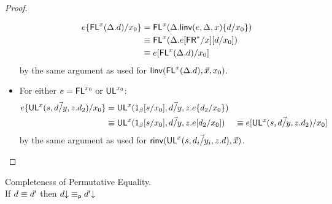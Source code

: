 \begin{proof}
\begin{itemize}
\begin{align*}
e\{\mathsf{FL}^{x}(\Delta.d)/x_0\} 
&= \mathsf{FL}^{x}(\Delta.\mathsf{linv}(e,\Delta,x)\{d/x_0\}) \\
&\equiv \mathsf{FL}^{x}(\Delta.e[\mathsf{FR}^*/x][d/x_0]) \\
&\equiv e[\mathsf{FL}^{x}(\Delta.d)/x_0] 
\end{align*}
by the same argument as used for $\mathsf{linv}(\mathsf{FL}^{x}(\Delta.d),\vec{x},x_0)$.
\item For either $e = \mathsf{FL}^{x_0} \text{ or } \mathsf{UL}^{x_0}$:
\begin{align*}
e\{\mathsf{UL}^{x}_{}(s,\vec{d/y},z.d_2)/x_0\} 
&= \mathsf{UL}^{x}_{}(1_\beta[s/x_0],\vec{d/y},z.e\{d_2/x_0\}) \\
&\equiv \mathsf{UL}^{x}_{}(1_\beta[s/x_0],\vec{d/y},z.e[d_2/x_0]) 
&\equiv e[\mathsf{UL}^{x}_{}(s,\vec{d/y},z.d_2)/x_0] 
\end{align*}
by the same argument as used for $\mathsf{rinv}(\mathsf{UL}^{x}_{}(s,\vec{d_i/y_i},z.d),\vec{x})$.
\end{itemize}
\end{proof}

\begin{conjecture}{Completeness of Permutative Equality.}\\ \label{thm:permutative-completeness}
If $d \equiv d'$ then $d\mathord{\downarrow} \equiv_{\mathsf{p}} d'\mathord{\downarrow}$
\end{conjecture}

